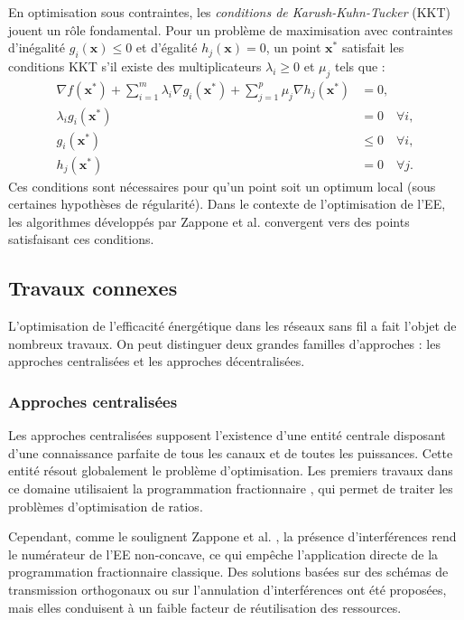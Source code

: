 \documentclass[conference]{IEEEtran}
\begin{document}
En optimisation sous contraintes, les \textit{conditions de Karush-Kuhn-Tucker} (KKT) jouent un rôle fondamental. Pour un problème de maximisation avec contraintes d'inégalité $g_i(\mathbf{x}) \leq 0$ et d'égalité $h_j(\mathbf{x}) = 0$, un point $\mathbf{x}^*$ satisfait les conditions KKT s'il existe des multiplicateurs $\lambda_i \geq 0$ et $\mu_j$ tels que :
\begin{align}
\nabla f(\mathbf{x}^*) + \sum_{i=1}^m \lambda_i \nabla g_i(\mathbf{x}^*) + \sum_{j=1}^p \mu_j \nabla h_j(\mathbf{x}^*) &= 0, \\
\lambda_i g_i(\mathbf{x}^*) &= 0 \quad \forall i, \\
g_i(\mathbf{x}^*) &\leq 0 \quad \forall i, \\
h_j(\mathbf{x}^*) &= 0 \quad \forall j.
\end{align}
Ces conditions sont nécessaires pour qu'un point soit un optimum local (sous certaines hypothèses de régularité). Dans le contexte de l'optimisation de l'EE, les algorithmes développés par Zappone et al. \cite{Zappone2021} convergent vers des points satisfaisant ces conditions.\subsection{Travaux connexes}

L'optimisation de l'efficacité énergétique dans les réseaux sans fil a fait l'objet de nombreux travaux. On peut distinguer deux grandes familles d'approches : les approches centralisées et les approches décentralisées.

\subsubsection{Approches centralisées}

Les approches centralisées supposent l'existence d'une entité centrale disposant d'une connaissance parfaite de tous les canaux et de toutes les puissances. Cette entité résout globalement le problème d'optimisation. Les premiers travaux dans ce domaine utilisaient la programmation fractionnaire \cite{Dinkelbach1967}, qui permet de traiter les problèmes d'optimisation de ratios.

Cependant, comme le soulignent Zappone et al. \cite{Zappone2021}, la présence d'interférences rend le numérateur de l'EE non-concave, ce qui empêche l'application directe de la programmation fractionnaire classique. Des solutions basées sur des schémas de transmission orthogonaux \cite{Ng2012, Xu2014} ou sur l'annulation d'interférences \cite{Xu2013} ont été proposées, mais elles conduisent à un faible facteur de réutilisation des ressources.
\end{document}

